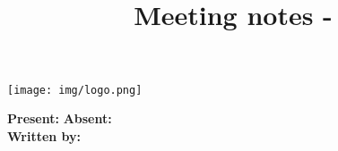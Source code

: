 \documentclass{article}
\begin{document}
    
    
    \vspace*{-3cm}
    \begin{flushright}
        \texttt{[image: img/logo.png]}
    \end{flushright}
    
    \vspace*{-1cm}
    \title{\textbf{\projectname}\\Meeting notes - \writtendate}
    \date{}
    {\let\newpage\relax\maketitle}
    \thispagestyle{empty}
    
    \vspace*{-1cm}
    \textbf{Present:} \present
    \textbf{Absent:} \absent\\[0.3cm]
    \textbf{Written by:} \writtenby
    \renewcommand{\contentsname}{Meeting agenda}
    \tableofcontents
    
    \pagestyle{fancy}
    
\end{document}
